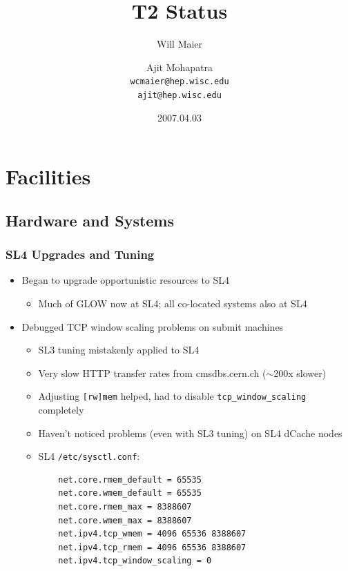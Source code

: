 \documentclass{beamer}
\title{T2 Status}
\author[Maier, Mohapatra]{
    Will Maier \and Ajit Mohapatra\\ 
    {\tt wcmaier@hep.wisc.edu}\\
    {\tt ajit@hep.wisc.edu}}
\institute[Wisconsin]{University of Wisconsin - High Energy Physics}
\date{2007.04.03}
\newcommand{\ca}{\ensuremath{\sim}}
\begin{document}
\begin{frame}
    \titlepage
\end{frame}


\section{Facilities}
\subsection{Hardware and Systems}
\begin{frame}[fragile]
    \frametitle{SL4 Upgrades and Tuning}
    \begin{itemize}
        \item Began to upgrade opportunistic resources to SL4
        \begin{itemize}
            \item Much of GLOW now at SL4; all co-located systems also at SL4
        \end{itemize}
        \item Debugged TCP window scaling problems on submit machines
        \begin{itemize}
            \item SL3 tuning mistakenly applied to SL4
            \item Very slow HTTP transfer rates from cmsdbs.cern.ch (\ca{}200x slower)
            \item Adjusting {\tt [rw]mem} helped, had to disable {\tt tcp\_window\_scaling} completely
            \item Haven't noticed problems (even with SL3 tuning) on SL4 dCache nodes
            \item SL4 {\tt /etc/sysctl.conf}:
    \footnotesize{
    \begin{verbatim}
    net.core.rmem_default = 65535
    net.core.wmem_default = 65535
    net.core.rmem_max = 8388607
    net.core.wmem_max = 8388607
    net.ipv4.tcp_wmem = 4096 65536 8388607
    net.ipv4.tcp_rmem = 4096 65536 8388607
    net.ipv4.tcp_window_scaling = 0
    \end{verbatim}}
        \end{itemize}
    \end{itemize}
\end{frame}
\end{document}

